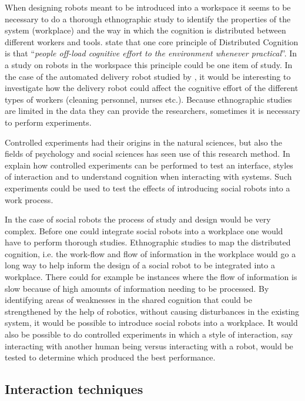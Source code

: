 When designing robots meant to be introduced into a workspace it seems to be necessary to do a thorough ethnographic study to identify the properties of the system (workplace) and the way in which the cognition is distributed between different workers and tools. \textcite[][181]{Hollan2000distributedcognition} state that one core principle of Distributed Cognition is that ``\textit{people off-load cognitive effort to the environment whenever practical}''. In a study on robots in the workspace this principle could be one item of study. In the case of the automated delivery robot studied by \textcite{Forlizzi2008hri}, it would be interesting to investigate how the delivery robot could affect the cognitive effort of the different types of workers (cleaning personnel, nurses etc.). Because ethnographic studies are limited in the data they can provide the researchers, sometimes it is necessary to perform experiments.

Controlled experiments had their origins in the natural sciences, but also the fields of psychology and social sciences has seen use of this research method. In  \textcite{blandford2008controlled} explain how controlled experiments can be performed to test an interface, styles of interaction and to understand cognition when interacting with systems. Such experiments could be used to test the effects of introducing social robots into a work process.

In the case of social robots the process of study and design would be very complex. Before one could integrate social robots into a workplace one would have to perform thorough studies. Ethnographic studies to map the distributed cognition, i.e. the work-flow and flow of information in the workplace would go a long way to help inform the design of a social robot to be integrated into a workplace. There could for example be instances where the flow of information is slow because of high amounts of information needing to be processed. By identifying areas of weaknesses in the shared cognition that could be strengthened by the help of robotics, without causing disturbances in the existing system, it would be possible to introduce social robots into a workplace. It would also be possible to do controlled experiments in which a style of interaction, say interacting with another human being versus interacting with a robot, would be tested to determine which produced the best performance.

\subsection{Interaction techniques}

